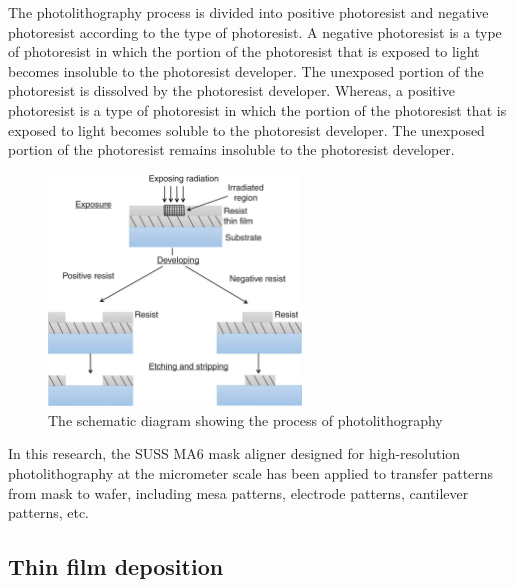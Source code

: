 The photolithography process is divided into positive photoresist and negative photoresist according to the type of photoresist. A negative photoresist is a type of photoresist in which the portion of the photoresist that is exposed to light becomes insoluble to the photoresist developer. The unexposed portion of the photoresist is dissolved by the photoresist developer. Whereas, a positive photoresist is a type of photoresist in which the portion of the photoresist that is exposed to light becomes soluble to the photoresist  developer. The unexposed portion of the photoresist remains insoluble to the photoresist developer.

\begin{figure}[H]
\centering    
\includegraphics[width=0.6\textwidth]{photoprocess}
\caption[The schematic diagram showing the process of photolithography]{The schematic diagram showing the process of photolithography \cite{ram2018advanced}}
\label{fig:photolithography}
\end{figure}


In this research, the SUSS MA6 mask aligner designed for high-resolution photolithography at the micrometer scale has been applied to transfer patterns from mask to wafer, including mesa patterns, electrode  patterns, cantilever  patterns, etc.

\subsection{Thin film deposition}

